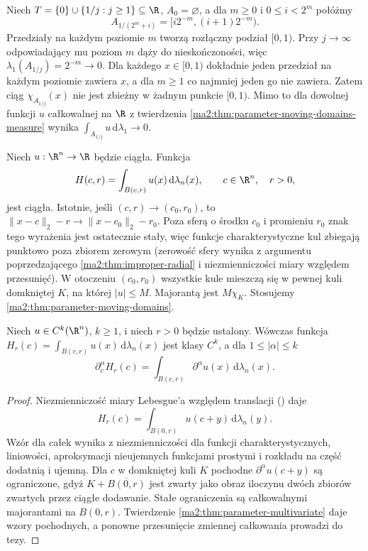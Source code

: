 \begin{przyklad}
\label{ma2:ex:parameter-moving-dyadic}
Niech $T=\{0\}\cup\{1/j:j\ge1\}\subseteq\R$,
$A_0=\varnothing$, a dla $m\ge0$ i
$0\le i<2^m$ połóżmy
\[
 A_{1/(2^m+i)}=[i2^{-m},(i+1)2^{-m}).
\]
Przedziały na każdym poziomie $m$ tworzą
rozłączny podział $[0,1)$. Przy $j\to\infty$
odpowiadający mu poziom $m$ dąży do nieskończoności,
więc $\lambda_1(A_{1/j})=2^{-m}\to0$.
Dla każdego $x\in[0,1)$ dokładnie jeden przedział
na każdym poziomie zawiera $x$, a dla $m\ge1$
co najmniej jeden go nie zawiera.
Zatem ciąg $\chi_{A_{1/j}}(x)$ nie jest zbieżny
w żadnym punkcie $[0,1)$.
Mimo to dla dowolnej funkcji $u$ całkowalnej
na $\R$ z twierdzenia
\ref{ma2:thm:parameter-moving-domains-measure}
wynika
$\int_{A_{1/j}}u\,\mathrm d\lambda_1\to0$.
\end{przyklad}

\begin{przyklad}
\label{ma2:ex:parameter-moving-ball}
Niech $u:\R^n\to\R$ będzie ciągła. Funkcja
\[
 H(c,r)=\int_{B(c,r)}u(x)\,\mathrm d\lambda_n(x),
 \qquad c\in\R^n,\quad r>0,
\]
jest ciągła. Istotnie, jeśli $(c,r)\to(c_0,r_0)$,
to $\|x-c\|_2-r\to\|x-c_0\|_2-r_0$.
Poza sferą o środku $c_0$ i promieniu $r_0$
znak tego wyrażenia jest ostatecznie stały,
więc funkcje charakterystyczne kul zbiegają
punktowo poza zbiorem zerowym (zerowość sfery
wynika z argumentu poprzedzającego
\ref{ma2:thm:improper-radial} i niezmienniczości
miary względem przesunięć).
W otoczeniu $(c_0,r_0)$ wszystkie kule mieszczą się
w pewnej kuli domkniętej $K$, na której $|u|\le M$.
Majorantą jest $M\chi_K$.
Stosujemy \ref{ma2:thm:parameter-moving-domains}.
\end{przyklad}

\begin{stwierdzenie}
\label{ma2:prop:parameter-ball-center}
Niech $u\in C^k(\R^n)$, $k\ge1$, i niech $r>0$
będzie ustalony. Wówczas funkcja
$H_r(c)=\int_{B(c,r)}u(x)\,\mathrm d\lambda_n(x)$
jest klasy $C^k$, a dla $1\le|\alpha|\le k$
\[
 \partial_c^\alpha H_r(c)
 =\int_{B(c,r)}\partial^\alpha u(x)\,
 \mathrm d\lambda_n(x).
\]
\end{stwierdzenie}
\begin{proof}
Niezmienniczość miary Lebesgue'a względem translacji
()
daje
\[
 H_r(c)=\int_{B(0,r)}u(c+y)\,\mathrm d\lambda_n(y).
\]
Wzór dla całek wynika z niezmienniczości dla
funkcji charakterystycznych, liniowości,
aproksymacji nieujemnych funkcjami prostymi
i rozkładu na część dodatnią i ujemną.
Dla $c$ w domkniętej kuli $K$ pochodne
$\partial^\alpha u(c+y)$ są ograniczone,
gdyż $K+\overline{B(0,r)}$ jest zwarty
jako obraz iloczynu dwóch zbiorów zwartych
przez ciągłe dodawanie. Stałe ograniczenia
są całkowalnymi majorantami na $B(0,r)$.
Twierdzenie \ref{ma2:thm:parameter-multivariate}
daje wzory pochodnych, a ponowne przesunięcie
zmiennej całkowania prowadzi do tezy.
\end{proof}

